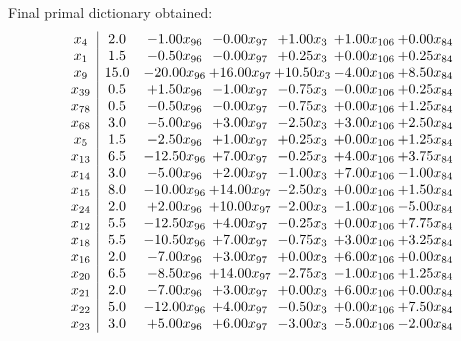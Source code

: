 \documentclass[8pt]{article}
\begin{document}
 Final primal dictionary obtained: 
\[\begin{array}{c| c c@{\hskip 2pt} c@{\hskip 2pt} c@{\hskip 2pt} c@{\hskip 2pt} c@{\hskip 2pt} }
 x_{4}   &  2.0 & -1.00 x_{96} & -0.00 x_{97} & +  1.00 x_{3} & +  1.00 x_{106} & +  0.00 x_{84}\\
 x_{1}   &  1.5 & -0.50 x_{96} & -0.00 x_{97} & +  0.25 x_{3} & +  0.00 x_{106} & +  0.25 x_{84}\\
 x_{9}   &  15.0 & -20.00 x_{96} & + 16.00 x_{97} & + 10.50 x_{3} & -4.00 x_{106} & +  8.50 x_{84}\\
 x_{39}   &  0.5 & +  1.50 x_{96} & -1.00 x_{97} & -0.75 x_{3} & -0.00 x_{106} & +  0.25 x_{84}\\
 x_{78}   &  0.5 & -0.50 x_{96} & -0.00 x_{97} & -0.75 x_{3} & +  0.00 x_{106} & +  1.25 x_{84}\\
 x_{68}   &  3.0 & -5.00 x_{96} & +  3.00 x_{97} & -2.50 x_{3} & +  3.00 x_{106} & +  2.50 x_{84}\\
 x_{5}   &  1.5 & -2.50 x_{96} & +  1.00 x_{97} & +  0.25 x_{3} & +  0.00 x_{106} & +  1.25 x_{84}\\
 x_{13}   &  6.5 & -12.50 x_{96} & +  7.00 x_{97} & -0.25 x_{3} & +  4.00 x_{106} & +  3.75 x_{84}\\
 x_{14}   &  3.0 & -5.00 x_{96} & +  2.00 x_{97} & -1.00 x_{3} & +  7.00 x_{106} & -1.00 x_{84}\\
 x_{15}   &  8.0 & -10.00 x_{96} & + 14.00 x_{97} & -2.50 x_{3} & +  0.00 x_{106} & +  1.50 x_{84}\\
 x_{24}   &  2.0 & +  2.00 x_{96} & + 10.00 x_{97} & -2.00 x_{3} & -1.00 x_{106} & -5.00 x_{84}\\
 x_{12}   &  5.5 & -12.50 x_{96} & +  4.00 x_{97} & -0.25 x_{3} & +  0.00 x_{106} & +  7.75 x_{84}\\
 x_{18}   &  5.5 & -10.50 x_{96} & +  7.00 x_{97} & -0.75 x_{3} & +  3.00 x_{106} & +  3.25 x_{84}\\
 x_{16}   &  2.0 & -7.00 x_{96} & +  3.00 x_{97} & +  0.00 x_{3} & +  6.00 x_{106} & +  0.00 x_{84}\\
 x_{20}   &  6.5 & -8.50 x_{96} & + 14.00 x_{97} & -2.75 x_{3} & -1.00 x_{106} & +  1.25 x_{84}\\
 x_{21}   &  2.0 & -7.00 x_{96} & +  3.00 x_{97} & +  0.00 x_{3} & +  6.00 x_{106} & +  0.00 x_{84}\\
 x_{22}   &  5.0 & -12.00 x_{96} & +  4.00 x_{97} & -0.50 x_{3} & +  0.00 x_{106} & +  7.50 x_{84}\\
 x_{23}   &  3.0 & +  5.00 x_{96} & +  6.00 x_{97} & -3.00 x_{3} & -5.00 x_{106} & -2.00 x_{84}\\

\end{array}\]
\end{document}

